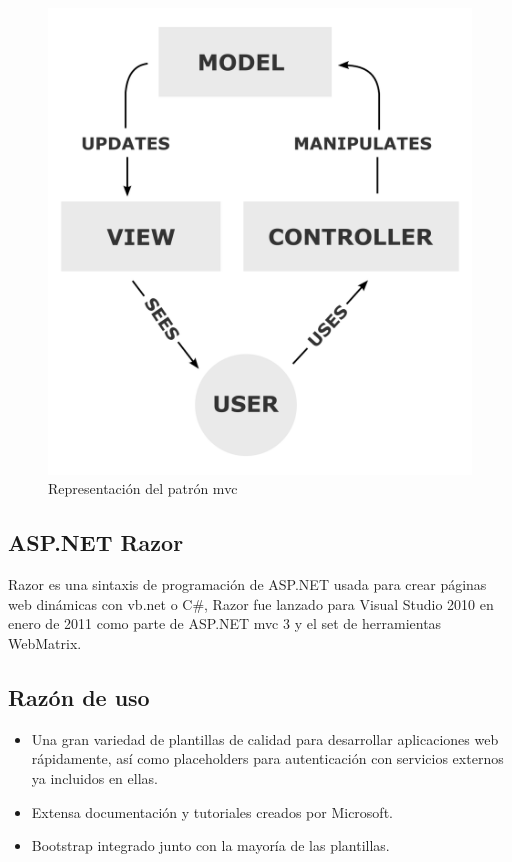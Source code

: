 \begin{figure}[!htbp]
	\centering
	\includegraphics[scale=0.50]{fig/mvc_pattern}
	\caption{Representación del patrón \acrshort{mvc}}
\end{figure}

\subsection{ASP.NET Razor}

Razor es una sintaxis de programación de ASP.NET usada para crear páginas web dinámicas con \acrshort{vb.net} o C#, Razor fue lanzado para Visual Studio 2010 en enero de 2011 como parte de ASP.NET \acrshort{mvc} 3 y el set de herramientas WebMatrix.



\subsection{Razón de uso}

\begin{itemize}
	\item Una gran variedad de plantillas de calidad para desarrollar aplicaciones web rápidamente, así como placeholders para autenticación con servicios externos ya incluidos en ellas.
	\item Extensa documentación y tutoriales creados por Microsoft.
	\item Bootstrap integrado junto con la mayoría de las plantillas.

\end{itemize}

